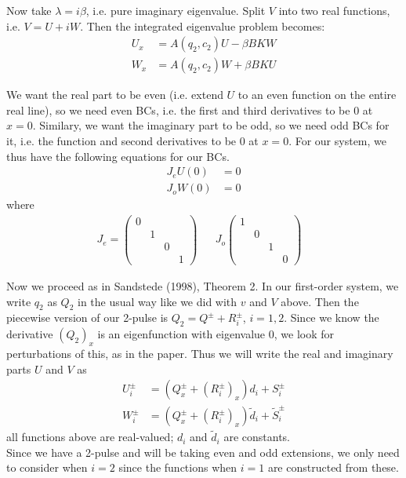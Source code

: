 \documentclass[12pt]{article}
\begin{document}
Now take $\lambda = i \beta$, i.e. pure imaginary eigenvalue. Split $V$ into two real functions, i.e. $V = U + i W$. Then the integrated eigenvalue problem becomes:
\begin{align*}
U_x &= A(q_2, c_2)U - \beta B K W \\
W_x &= A(q_2, c_2)W + \beta B K U
\end{align*}

We want the real part to be even (i.e. extend $U$ to an even function on the entire real line), so we need even BCs, i.e. the first and third derivatives to be 0 at $x = 0$. Similary, we want the imaginary part to be odd, so we need odd BCs for it, i.e. the function and second derivatives to be 0 at $x = 0$. For our system, we thus have the following equations for our BCs.
\begin{align*}
J_e U(0) &= 0 \\
J_o W(0) &= 0
\end{align*}
where 
\begin{align*}
J_e = \begin{pmatrix}0&&&\\&1&&\\&&0&\\&&&1\end{pmatrix}&& J_o\begin{pmatrix}1&&&\\&0&&\\&&1&\\&&&0\end{pmatrix}&
\end{align*}

Now we proceed as in Sandstede (1998), Theorem 2. In our first-order system, we write $q_2$ as $Q_2$ in the usual way like we did with $v$ and $V$ above. Then the piecewise version of our 2-pulse is $Q_2 = Q^\pm + R_i^\pm$, $i = 1, 2$. Since we know the derivative $(Q_2)_x$ is an eigenfunction with eigenvalue 0, we look for perturbations of this, as in the paper. Thus we will write the real and imaginary parts $U$ and $V$ as
\begin{align*}
U^\pm_i &= ( Q^\pm_x + (R^\pm_i)_x) d_i + S^\pm_i \\
W^\pm_i &= ( Q^\pm_x + (R^\pm_i)_x) \tilde{d}_i + \tilde{S}^\pm_i
\end{align*}
all functions above are real-valued; $d_i$ and $\tilde{d}_i$ are constants. \\

Since we have a 2-pulse and will be taking even and odd extensions, we only need to consider when $i = 2$ since the functions when $i = 1$ are constructed from these. \\
\end{document}

